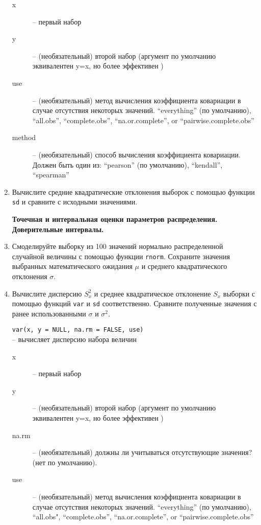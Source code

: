 \begin{enumerate}
\begin{mdframed}[style=BadassFrame]
\begin{description}
                \item[x] -- первый набор
                \item[y] -- (необязательный) второй набор (аргумент по умолчанию эквивалентен y=x, но более эффективен )
                \item[use] -- (необязательный) метод вычисления коэффициента ковариации в случае отсутствия некоторых значений.
                    ``everything'' (по умолчанию), ``all.obs'', ``complete.obs'', ``na.or.complete'', or ``pairwise.complete.obs''
                \item[method] -- (необязательный) способ вычисления коэффициента ковариации. Должен быть один из: 
                    ``pearson'' (по умолчанию), ``kendall'', ``spearman''
              \end{description}
          \end{mdframed}

    \item Вычислите средние квадратические отклонения выборок с помощью функции \texttt{sd} и сравните
          с исходными значениями.


    \textbf{Точечная и интервальная оценки параметров распределения. Доверительные интервалы.}

    \item Смоделируйте выборку из 100 значений нормально распределенной случайной величины с помощью
          функции \texttt{rnorm}. Сохраните значения выбранных математического ожидания $\mu$ и 
          среднего квадратического отклонения $\sigma$.

    \item Вычислите дисперсию $S_x^2$ и среднее квадратическое отклонение $S_x$ выборки с помощью 
          функций \texttt{var} и \texttt{sd} соответственно. Сравните полученные значения с ранее использованными 
          $\sigma$ и $\sigma^2$.

          \begin{mdframed}[style=BadassFrame]

              \texttt{var(x, y = NULL, na.rm = FALSE, use)} \\ -- вычисляет дисперсию набора величин
              \begin{description}

                \item[x] -- первый набор
                \item[y] -- (необязательный) второй набор (аргумент по умолчанию эквивалентен y=x, но более эффективен )
                \item[na.rm] -- (необязательный) должны ли учитываться отсутствующие значения? (нет по умолчанию).
                \item[use] -- (необязательный) метод вычисления коэффициента ковариации в случае отсутствия некоторых значений.
                    ``everything'' (по умолчанию), ``all.obs", ``complete.obs'', ``na.or.complete'', or ``pairwise.complete.obs''
              \end{description}
          \end{mdframed}


\end{enumerate}
